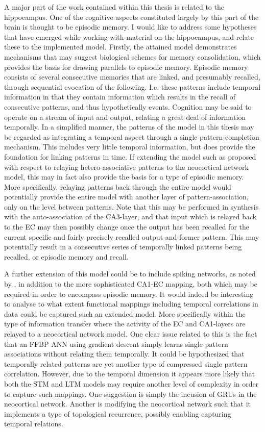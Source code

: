 A major part of the work contained within this thesis is related to the hippocampus. One of the cognitive aspects constituted largely by this part of the brain is thought to be episodic memory. I would like to address some hypotheses that have emerged while working with material on the hippocampus, and relate these to the implemented model.
Firstly, the attained model demonstrates mechanisms that may suggest biological schemes for memory consolidation, which provides the basis for drawing parallels to episodic memory. Episodic memory consists of several consecutive memories that are linked, and presumably recalled, through sequential evocation of the following. I.e. these patterns include temporal information in that they contain information which results in the recall of consecutive patterns, and thus hypothetically events.
Cognition may be said to operate on a stream of input and output, relating a great deal of information temporally. 
In a simplified manner, the patterns of the model in this thesis may be regarded as integrating a temporal aspect through a single pattern-completion mechanism. This includes very little temporal information, but does provide the foundation for linking patterns in time. 
If extending the model such as proposed with respect to relaying hetero-associative patterns to the neocortical network model, this may in fact also provide the basis for a type of episodic memory.
More specifically, relaying patterns back through the entire model would potentially provide the entire model with another layer of pattern-association, only on the level between patterns. Note that this may be performed in synthesis with the auto-association of the CA3-layer, and that input which is relayed back to the EC may then possibly change once the output has been recalled for the current specific and fairly precisely recalled output and former pattern. This may potentially result in a consecutive series of temporally linked patterns being recalled, or episodic memory and recall.

A further extension of this model could be to include spiking networks, as noted by \cite{Hattori2014}, in addition to the more sophisticated CA1-EC mapping, both which may be required in order to encompass episodic memory.
It would indeed be interesting to analyse to what extent functional mappings including temporal correlations in data could be captured such an extended model. More specifically within the type of information transfer where the activity of the EC and CA1-layers are relayed to a neocortical network model.
One clear issue related to this is the fact that an FFBP ANN using gradient descent simply learns single pattern associations without relating them temporally.
It could be hypothesized that temporally related patterns are yet another type of compressed single pattern correlation. However, due to the temporal dimension it appears more likely that both the STM and LTM models may require another level of complexity in order to capture such mappings. One suggestion is simply the incusion of GRUs in the neocortical network. Another is modifying the neocortical network such that it implements a type of topological recurrence, possibly enabling capturing temporal relations.

